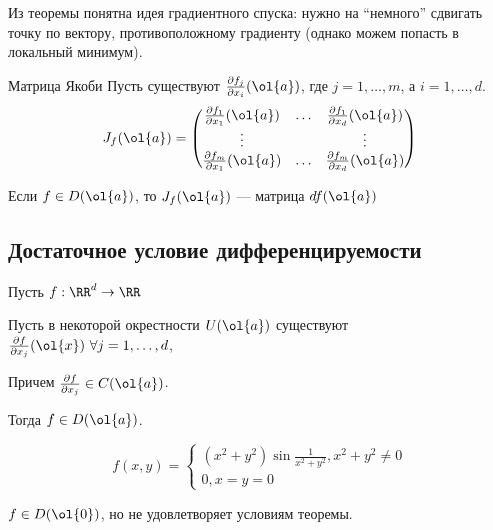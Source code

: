 Из теоремы понятна идея градиентного спуска: нужно на ``немного'' сдвигать точку
по вектору, противоположному градиенту (однако можем попасть в локальный минимум).

\begin{defn}{Матрица Якоби}{}
    Пусть существуют \( \frac{\partial f_j}{\partial x_i} (\ol{a}) \),
    где \( j = 1, \ldots, m \), а \( i = 1, \ldots, d \).
    \[
        J_f (\ol{a}) = \begin{pmatrix}
            \frac{\partial f_1}{\partial x_1} (\ol{a}) & \ldots & \frac{\partial f_1}{\partial x_d} (\ol{a})
            \\
            \vdots & & \vdots
            \\
            \frac{\partial f_m}{\partial x_1} (\ol{a}) & \ldots & \frac{\partial f_m}{\partial x_d} (\ol{a})
        \end{pmatrix}
    \]

    Если \( f \in D(\ol{a}) \), то \( J_f (\ol{a}) \) --- матрица \( df(\ol{a}) \)
\end{defn}

\newpage

\subsection{Достаточное условие дифференцируемости}

\begin{thrm}{}{}
    Пусть \( f : \RR^d \to \RR \)

    Пусть в некоторой окрестности \( U(\ol{a}) \)
    существуют \( \frac{\partial f}{\partial x_j} (\ol{x}) \ \forall j = 1, \ldots, d \),

    Причем \( \frac{\partial f}{\partial x_j} \in C(\ol{a}) \).

    Тогда \( f \in D(\ol{a}) \).
\end{thrm}

\begin{example}{}{}
    \[
        f(x, y) = \begin{cases}
            (x^2 + y^2) \sin \frac{1}{x^2 + y^2}, x^2 + y^2 \neq 0
            \\
            0, x = y = 0
        \end{cases}
    \]

    \( f \in D(\ol{0}) \), но не удовлетворяет условиям теоремы.
\end{example}


